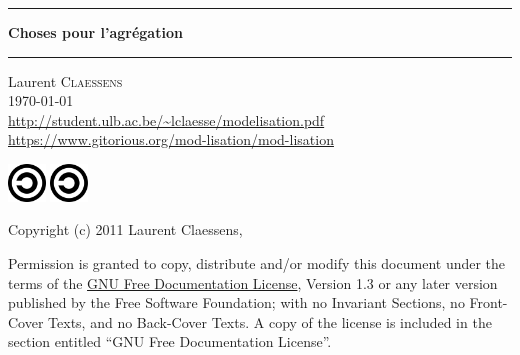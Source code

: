 \thispagestyle{empty}
\begin{center}
  \begin{minipage}{15cm}
    \hrule\par
    \vspace{2mm}
    \begin{center}
    \Huge \bfseries Choses pour l'agrégation \par
    \end{center}
    \hrule\par
  \end{minipage}
\end{center}

\vspace{2cm}

\begin{center}
    Laurent \textsc{Claessens}\\
    \today\\
    \url{http://student.ulb.ac.be/~lclaesse/modelisation.pdf}\\
    \url{https://www.gitorious.org/mod-lisation/mod-lisation}
\end{center}

\vfill

\begin{center}

           \ifpdf
            \includegraphics[width=1cm]{Copyleft.svg}
        \else
            \includegraphics[width=1cm]{Copyleft.eps}
        \fi



Copyright (c) 2011  Laurent Claessens,

Permission is granted to copy, distribute and/or modify this document under the terms of the \href{http://www.gnu.org/licenses/fdl-1.3.html}{GNU Free Documentation License}, Version 1.3 or any later version published by the Free Software Foundation; with no Invariant Sections, no Front-Cover Texts, and no Back-Cover Texts. A copy of the license is included in the section entitled ``GNU Free Documentation License''.


\end{center}

\clearpage

